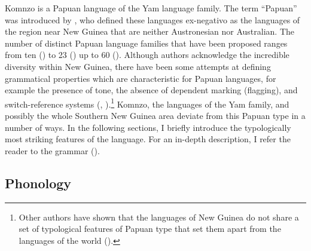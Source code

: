 Komnzo is a Papuan language of the Yam language family. The term ``Papuan'' was introduced by \textcite[16]{Ray:1895jw}, who defined these languages ex-negativo as the languages of the region near New Guinea that are neither Austronesian nor Australian. The number of distinct Papuan language families that have been proposed ranges from ten (\cite{Wurm:1975dk}) to 23 (\cite{Ross:2005cu}) up to 60 (\cite{Foley:1986jl}). Although authors acknowledge the incredible diversity within New Guinea, there have been some attempts at defining grammatical properties which are characteristic for Papuan languages, for example the presence of tone, the absence of dependent marking (flagging), and switch-reference systems (\cite{Foley:1986jl}, \citeyear{Foley:2000uh}).\footnote{Other authors have shown that the languages of New Guinea do not share a set of typological features of Papuan type that set them apart from the languages of the world (\cite{Comrie:2012yo}).} Komnzo, the languages of the Yam family, and possibly the whole Southern New Guinea area deviate from this Papuan type in a number of ways. In the following sections, I briefly introduce the typologically most striking features of the language. For an in-depth description, I refer the reader to the grammar (\cite{Dohler:2018qt}).

\subsection{Phonology}

